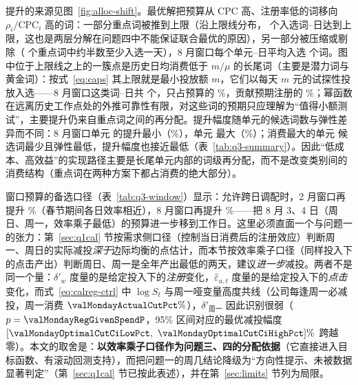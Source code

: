 

提升的来源见图~\ref{fig:alloc-shift}。最优解把预算从 CPC 高、注册率低的词移向 $\rho_i/\mathrm{CPC}_i$ 高的词：一部分重点词被推到上限（沿上限线分布，\valQthreeCappedKeywordDays{} 个入选词--日达到上限，这也是两层分解在问题四中不能保证联合最优的原因），另一部分被压缩或剔除（\valKeyCount{} 个重点词中约半数至少入选一天），8 月窗口每个单元--日平均入选 \valQthreeMeanSelectedAug{} 个词。图中位于上限线之上的一簇点是历史日均消费低于 $m/\mu$ 的长尾词（主要是潜力词与黄金词）：按式~\eqref{eq:caps} 其上限就是最小投放额 $m$，它们以每天 $m$ 元的试探性投放入选——8 月窗口这类词--日共 \valQthreeFloorKeywordDaysAug{} 个，只占预算的 \valQthreeFloorSpendSharePctAug\%，贡献预期注册的 \valQthreeFloorRegsSharePctAug\%；幂函数在远离历史工作点处的外推可靠性有限，对这些词的预期只应理解为“值得小额测试”，主要提升仍来自重点词之间的再分配。提升幅度随单元的候选词数与弹性差异而不同：8 月窗口单元 \valQthreeMinGainUnitAug{} 的提升最小（\valQthreeMinUnitGainPctAug\%），单元 \valQthreeMaxGainUnitAug{} 最大（\valQthreeMaxUnitGainPctAug\%）；消费最大的单元 \valBiggestUnitId{} 候选词最少且弹性最低，提升幅度也接近最低（表~\ref{tab:q3-summary}）。因此“低成本、高效益”的实现路径主要是长尾单元内部的词级再分配，而不是改变类别间的消费结构（重点词在两种方案下都占消费的绝大部分）。


窗口预算的备选口径（表~\ref{tab:q3-window}）显示：允许跨日调配时，2 月窗口再提升 \valQthreeWindowGainPctFeb\%（春节期间各日效率相近），8 月窗口再提升 \valQthreeWindowGainPctAug\%——把 8 月 3、4 日（周日、周一，效率乘子最低）的预算进一步移到工作日。这里必须直面一个与问题一的张力：第~\ref{sec:q1cal} 节按需求侧口径（控制当日消费后的注册效应）判断周一、周日的实际减投\emph{深于}边际均衡的点估计，而本节按效率乘子口径（同样投入下的点击产出）判断周日、周一是全年产出最低的两天，建议\emph{进一步}减投。两者不是同一个量：$\delta'_w$ 度量的是给定投入下的\emph{注册}变化，$\hat\varepsilon_{u,t}$ 度量的是给定投入下的\emph{点击}变化，而式~\eqref{eq:calreg-ctrl} 中 $\log S_t$ 与周一哑变量高度共线（公司每逢周一必减投，周一消费 $\valMondayActualCutPct\%$），$\delta'_{\text{周一}}$ 因此识别很弱（$p=\valMondayRegGivenSpendP$，95\% 区间对应的最优减投幅度 $[\valMondayOptimalCutCiLowPct,\ \valMondayOptimalCutCiHighPct]\%$ 跨越零）。本文的取舍是：\textbf{以效率乘子口径作为问题三、四的分配依据}（它直接进入目标函数、有滚动回测支持），而把问题一的周几结论降级为“方向性提示、未被数据显著判定”（第~\ref{sec:q1cal} 节已按此表述），并在第~\ref{sec:limits} 节列为局限。

